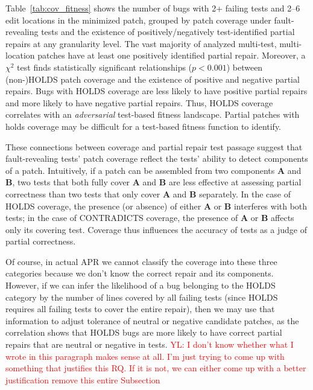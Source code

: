 \documentclass[10pt, conference]{IEEEtran}
\newcommand\todo[1]{\textcolor{red}{#1}}
\begin{document}
Table~\ref{tab:cov_fitness} shows the number of bugs with 2+ failing tests
and 2--6 edit locations in the minimized patch, grouped by patch coverage
under fault-revealing tests and the existence of positively/negatively test-identified
partial repairs at any granularity level.
The vast majority of analyzed multi-test, multi-location patches have at least
one positively identified partial repair.
Moreover, a $\chi^2$ test finds statistically significant relationships ($p < 0.001$)
between (non-)HOLDS patch coverage and the existence of positive and
negative partial repairs. Bugs with HOLDS coverage are less likely to have
positive partial repairs and more likely to have negative partial repairs.
Thus, HOLDS coverage correlates with an
\emph{adversarial} test-based fitness landscape.
Partial patches with holds coverage may be difficult for a test-based
fitness function to identify.

These connections between coverage and partial repair test passage
suggest that fault-revealing tests' patch coverage reflect the tests' ability
to detect components of a patch.
Intuitively, if a patch can be
assembled from two components \textbf{A} and \textbf{B}, two tests that both
fully cover \textbf{A} and \textbf{B} are less effective at assessing partial
correctness than two tests that only cover \textbf{A} and \textbf{B} separately.
In the case of HOLDS coverage, the presence (or absence) of either \textbf{A} or 
\textbf{B} interferes with both tests; in the case of CONTRADICTS coverage, the presence of 
\textbf{A} or \textbf{B} affects only its covering test.
Coverage thus influences the accuracy of tests as a judge of partial correctness.

Of course, in actual APR we cannot classify the coverage into these three categories 
because we don't know the correct repair and its components. However, if we can infer the
likelihood of a bug belonging to the HOLDS category by the number of lines covered by all
failing tests (since HOLDS requires all failing tests to cover the entire repair), then we
may use that information to adjust tolerance of neutral or negative candidate patches, as
the correlation shows that HOLDS bugs are more likely to have correct partial repairs that
are neutral or negative in tests. \todo{YL: I don't know whether what I wrote in this paragraph
makes sense at all. I'm just trying to come up
with something that justifies this RQ. If it is not, we can either come up with a better justification
remove this entire Subsection}
\end{document}
